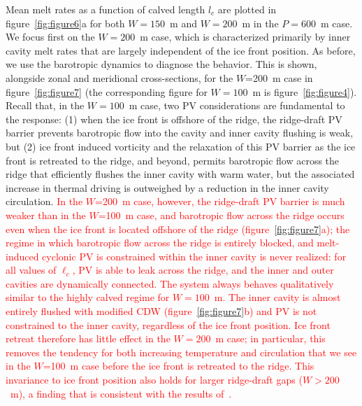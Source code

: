 \documentclass[draft]{agujournal2019}
\newcommand{\red}[1]{\textcolor{red}{#1}}
\begin{document}
Mean melt rates as a function of calved length $l_c$ are plotted in figure~\ref{fig:figure6}a for both $W=150$~m and $W=200$~m in the $P = 600$~m case. We focus first on the $W = 200$~m case, which is characterized primarily by inner cavity melt rates that are largely independent of the ice front position. As before, we use the barotropic dynamics to diagnose the behavior. This is shown, alongside zonal and meridional cross-sections, for the $W$=200~m case in  figure~\ref{fig:figure7} (the corresponding figure for $W = 100$~m is figure~\ref{fig:figure4}). Recall that, in the $W=100$~m case, two PV considerations are fundamental to the response: (1) when the ice front is offshore of the ridge, the ridge-draft PV barrier prevents barotropic flow into the cavity and inner cavity flushing is weak, but (2) ice front induced vorticity and the relaxation of this PV barrier as the ice front is retreated to the ridge, and beyond, permits barotropic flow across the ridge that efficiently flushes the inner cavity with warm water, but the associated increase in thermal driving is outweighed by a reduction in the inner cavity circulation.\red{ In the $W$=200~m case, however, the ridge-draft PV barrier is much weaker than in the $W$=100~m case, and barotropic flow across the ridge occurs even when the ice front is located offshore of the ridge (figure~\ref{fig:figure7}a); the regime in which barotropic flow across the ridge is entirely blocked, and melt-induced cyclonic PV is constrained within the inner cavity is never realized: for all values of $\ell_c$, PV is able to leak across the ridge, and the inner and outer cavities are dynamically connected. The system always behaves qualitatively similar to the highly calved regime for $W = 100$~m. The inner cavity is almost entirely flushed with modified CDW (figure~\ref{fig:figure7}b) and PV is not constrained to the inner cavity, regardless of the ice front position. Ice front retreat therefore has little effect in the $W = 200$~m case; in particular, this removes the tendency for both increasing temperature and circulation that we see in the $W$=100~m case before the ice front is retreated to the ridge. This invariance to ice front position also holds for larger ridge-draft gaps ($W>200$~m), a finding that is consistent with the results of~\citeA{DeRydt2014JGeophysResOceans}.}
\end{document}
